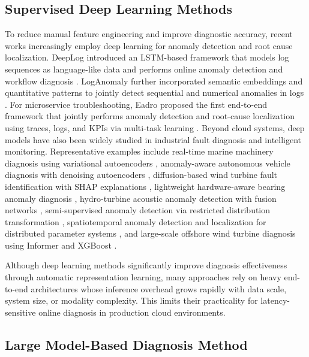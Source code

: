 \subsection{Supervised Deep Learning Methods}

To reduce manual feature engineering and improve diagnostic accuracy, recent works increasingly employ deep learning for anomaly detection and root cause localization. DeepLog introduced an LSTM-based framework that models log sequences as language-like data and performs online anomaly detection and workflow diagnosis \cite{du2017deeplog}. LogAnomaly further incorporated semantic embeddings and quantitative patterns to jointly detect sequential and numerical anomalies in logs \cite{meng2019loganomaly}. For microservice troubleshooting, Eadro proposed the first end-to-end framework that jointly performs anomaly detection and root-cause localization using traces, logs, and KPIs via multi-task learning \cite{10172617}. Beyond cloud systems, deep models have also been widely studied in industrial fault diagnosis and intelligent monitoring. Representative examples include real-time marine machinery diagnosis using variational autoencoders \cite{VELASCOGALLEGO2022117634}, anomaly-aware autonomous vehicle diagnosis with denoising autoencoders \cite{MIN2023120002}, diffusion-based wind turbine fault identification with SHAP explanations \cite{YAO2025127925}, lightweight hardware-aware bearing anomaly diagnosis \cite{11040080}, hydro-turbine acoustic anomaly detection with fusion networks \cite{10858663}, semi-supervised anomaly detection via restricted distribution transformation \cite{11071974}, spatiotemporal anomaly detection and localization for distributed parameter systems \cite{10829379}, and large-scale offshore wind turbine diagnosis using Informer and XGBoost \cite{10978904}.

Although deep learning methods significantly improve diagnosis effectiveness through automatic representation learning, many approaches rely on heavy end-to-end architectures whose inference overhead grows rapidly with data scale, system size, or modality complexity. This limits their practicality for latency-sensitive online diagnosis in production cloud environments.

\subsection{Large Model-Based Diagnosis Method}

